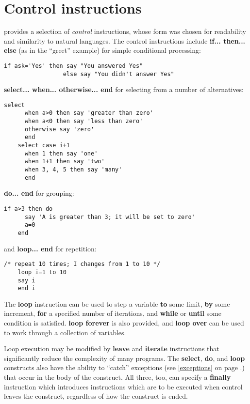 \section{Control instructions}
\nr{} provides a selection of \emph{control} instructions, whose form was
chosen for readability and similarity to natural languages. The
control instructions include \textbf{if... then... else} (as in the “greet”
example) for simple conditional processing:
\begin{lstlisting}[label=Conditional,caption=Conditional]
    if ask='Yes' then say "You answered Yes"
                 else say "You didn't answer Yes"
\end{lstlisting}
\textbf{select... when... otherwise... end} for selecting from a number of
alternatives:
\begin{lstlisting}[label=selectwhenotherwise,caption=select - when - otherwise]
    select
      when a>0 then say 'greater than zero'
      when a<0 then say 'less than zero'
      otherwise say 'zero'
      end
    select case i+1
      when 1 then say 'one'
      when 1+1 then say 'two'
      when 3, 4, 5 then say 'many'
      end
\end{lstlisting}
\textbf{do... end} for grouping:
\begin{lstlisting}[label=doend,caption=do - end]
    if a>3 then do
      say 'A is greater than 3; it will be set to zero'
      a=0
    end
\end{lstlisting}
and \textbf{loop... end} for repetition:
\begin{lstlisting}[label=loopend,caption=loop - end]
    /* repeat 10 times; I changes from 1 to 10 */
    loop i=1 to 10
    say i 
    end i
\end{lstlisting}
The \textbf{loop} instruction can be used to step a variable
\textbf{to} some limit, \textbf{by} some increment, \textbf{for} a
specified number of iterations, and \textbf{while} or \textbf{until}
some condition is satisfied. \textbf{loop forever} is also provided,
and \textbf{loop over} can be used to work through a collection of
variables.

Loop execution may be modified by \textbf{leave} and \textbf{iterate} instructions that significantly reduce the complexity of many programs.
The \textbf{select}, \textbf{do}, and \textbf{loop} constructs also have the ability to “catch”
exceptions (see \ref{exceptions} on page \pageref{exceptions}.) that occur in the body of the construct. All
three, too, can specify a \textbf{finally} instruction which introduces
instructions which are to be executed when control leaves the
construct, regardless of how the construct is ended.


